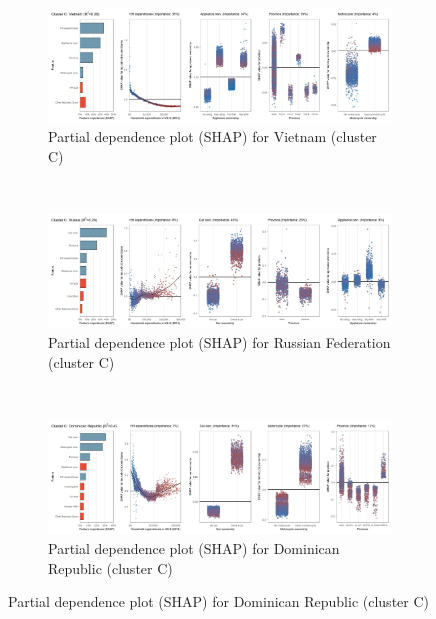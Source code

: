 \begin{figure}[ht!]\ContinuedFloat
    \centering
   \begin{subfigure}[b]{\textwidth}
         \centering
         \caption{Partial dependence plot (SHAP) for Vietnam (cluster C)}
         \label{fig:5b_VNM}
         \includegraphics[width=\textwidth]{Figure 5b/Figure_5b_VNM}         
     \end{subfigure}
    \\
    \vspace{0.5cm}
   \begin{subfigure}[b]{\textwidth}
         \centering
         \caption{Partial dependence plot (SHAP) for Russian Federation (cluster C)}
         \label{fig:5b_RUS}
         \includegraphics[width=\textwidth]{Figure 5b/Figure_5b_RUS}         
     \end{subfigure}
    \\
    \vspace{0.5cm}
   \begin{subfigure}[b]{\textwidth}
         \centering
         \caption{Partial dependence plot (SHAP) for Dominican Republic (cluster C)}
         \label{fig:5b_DOM}
         \includegraphics[width=\textwidth]{Figure 5b/Figure_5b_DOM}

\end{subfigure}
\end{figure}
